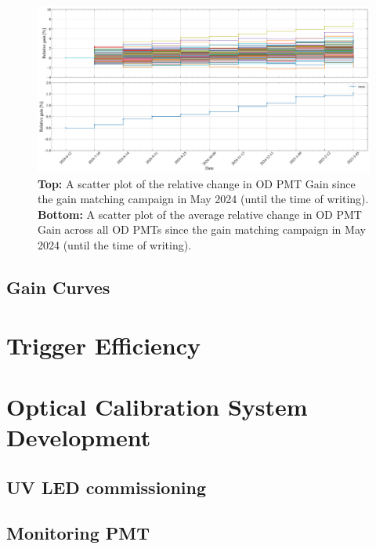 \begin{figure}
    \centering
    \includegraphics[width=\textwidth]{figures/ODCommissioning/RelativegainOverTime_AllPMTs_Both_Full_WS2024May2024Onwards.pdf}
    \caption{\textbf{Top:} A scatter plot of the relative change in OD PMT Gain since the gain matching campaign in May 2024 (until the time of writing). \textbf{Bottom:} A scatter plot of the average relative change in OD PMT Gain across all OD PMTs since the gain matching campaign in May 2024 (until the time of writing).}
    \label{fig:RelativeGain_WS2024May2024Onwards}
\end{figure}
\subsection{Gain Curves}
\section{Trigger Efficiency}

\section{Optical Calibration System Development}
\subsection{UV LED commissioning}

\subsection{Monitoring PMT}